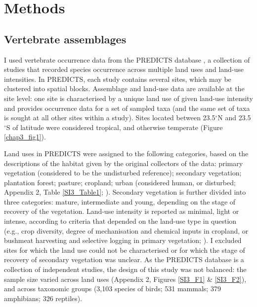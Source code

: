 \section{Methods}

\subsection{Vertebrate assemblages}

I used vertebrate occurrence data from the PREDICTS database \citep{Hudson2014, Hudson2017}, a collection of studies that recorded species occurrence across multiple land uses and land-use intensities. In PREDICTS, each study contains several sites, which may be clustered into spatial blocks. Assemblage and land-use data are available at the site level: one site is characterised by a unique land use of given land-use intensity and provides occurrence data for a set of sampled taxa (and the same set of taxa is sought at all other sites within a study). Sites located between 23.5$^{\circ}$N and 23.5$^{\circ}$S of latitude were considered tropical, and otherwise temperate (Figure \ref{chap3_fig1}).

Land uses in PREDICTS were assigned to the following categories, based on the descriptions of the habitat given by the original collectors of the data: primary vegetation (considered to be the undisturbed reference); secondary vegetation; plantation forest; pasture; cropland; urban (considered human, or disturbed; Appendix 2, Table \ref{SI3_Table1};  \cite{Hudson2014, Hudson2017}). Secondary vegetation is further divided into three categories: mature, intermediate and young, depending on the stage of recovery of the vegetation. Land-use intensity is reported as minimal, light or intense, according to criteria that depended on the land-use type in question (e.g., crop diversity, degree of mechanisation and chemical inputs in cropland, or bushmeat harvesting and selective logging in primary vegetation; \cite{Hudson2014}). I excluded sites for which the land use could not be characterised or for which the stage of recovery of secondary vegetation was unclear. As the PREDICTS database is a collection of independent studies, the design of this study was not balanced: the sample size varied across land uses (Appendix 2, Figures \ref{SI3_F1} \& \ref{SI3_F2}), and across taxonomic groups (3,103 species of birds; 531 mammals; 379 amphibians; 326 reptiles).

